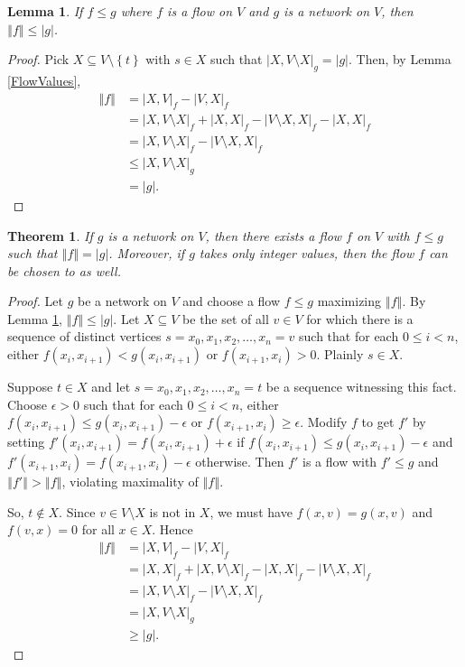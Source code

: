 \documentclass[openany]{tufte-book} %
\theoremstyle{plain}
\newtheorem{lemma}{Lemma}
\newtheorem{theorem}{Theorem}
\newcommand{\set}[1]{\left\{ #1 \right\}}
\newcommand{\card}[1]{\left|#1\right|}
\newcommand{\size}[1]{\left\Vert#1\right\Vert}
\begin{document}
\begin{lemma}\label{FlowAtMostCapacity}
If $f \le g$ where $f$ is a flow on $V$ and $g$ is a network on $V$, then $\size{f} \le \card{g}$.
\end{lemma}
\begin{proof}
Pick $X \subseteq V\setminus\set{t}$ with $s \in X$ such that $\card{X, V\setminus X}_g = \card{g}$.  Then, by Lemma \ref{FlowValues}, 
\begin{align*}
\size{f} &= \card{X, V}_f - \card{V, X}_f \\
&= \card{X, V\setminus X}_f + \card{X,X}_f - \card{V\setminus X, X}_f - \card{X,X}_f \\
&= \card{X, V\setminus X}_f - \card{V\setminus X, X}_f\\
&\le \card{X, V\setminus X}_g \\
&= \card{g}.
\end{align*}
\end{proof}

\begin{theorem}\label{MaxFlowMinCut}
If $g$ is a network on $V$, then there exists a flow $f$ on $V$ with $f \le g$ such that $\size{f} = \card{g}$.
Moreover, if $g$ takes only integer values, then the flow $f$ can be chosen to as well.
\end{theorem}
\begin{proof}
Let $g$ be a network on $V$ and choose a flow $f \le g$ maximizing $\size{f}$.  By Lemma \ref{FlowAtMostCapacity}, $\size{f} \le \card{g}$.
Let $X \subseteq V$ be the set of all $v \in V$ for which there is a sequence of distinct vertices $s = x_0, x_1, x_2, \ldots, x_n = v$ such that for each $0 \le i < n$, either
$f(x_i, x_{i+1}) < g(x_i, x_{i+1})$ or $f(x_{i+1}, x_i) > 0$.  Plainly $s \in X$.

Suppose $t \in X$ and let $s = x_0, x_1, x_2, \ldots, x_n = t$ be a sequence witnessing this fact.  
Choose $\epsilon > 0$ such that for each $0 \le i < n$, either $f(x_i, x_{i+1}) \le g(x_i, x_{i+1}) - \epsilon$ or $f(x_{i+1}, x_i) \ge \epsilon$.  Modify $f$ to get $f'$
by setting $f'(x_i, x_{i+1}) = f(x_i, x_{i+1}) + \epsilon$ if $f(x_i, x_{i+1}) \le g(x_i, x_{i+1}) - \epsilon$ and $f'(x_{i+1}, x_i) = f(x_{i+1}, x_i) -\epsilon$ otherwise.
Then $f'$ is a flow with $f' \le g$ and $\size{f'} > \size{f}$, violating maximality of $\size{f}$.

So, $t \not \in X$.  Since $v \in V \setminus X$ is not in $X$, we must have $f(x, v) = g(x,v)$ and $f(v,x) = 0$ for all $x \in X$.  Hence
\begin{align*}
\size{f} &= \card{X, V}_f - \card{V, X}_f \\
&= \card{X, X}_f + \card{X, V\setminus X}_f - \card{X, X}_f - \card{V\setminus X, X}_f\\
&= \card{X, V\setminus X}_f - \card{V\setminus X, X}_f\\
&= \card{X, V\setminus X}_g\\
&\ge \card{g}.
\end{align*}
\end{proof}
\end{document}
